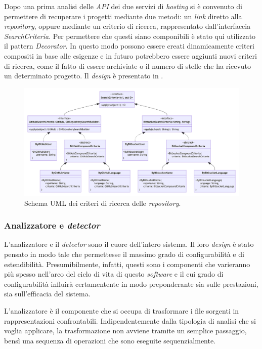 Dopo una prima analisi delle \textit{API} dei due servizi di \textit{hosting} si è convenuto di permettere di recuperare i progetti mediante due metodi: un \textit{link} diretto alla \textit{repository}, oppure mediante un criterio di ricerca, rappresentato dall'interfaccia \textit{SearchCriteria}.
%
Per permettere che questi siano componibili è stato qui utilizzato il pattern \textit{Decorator}.
%
In questo modo possono essere creati dinamicamente criteri compositi in base alle esigenze e in futuro potrebbero essere aggiunti nuovi criteri di ricerca, come il fatto di essere archiviate o il numero di stelle che ha ricevuto un determinato progetto.
%
Il \textit{design} è presentato in .

\begin{figure}[h!]
    \centering
    \includegraphics[width=\textwidth]{resources/img/02-search-criteria.pdf}
    \caption{Schema UML dei criteri di ricerca delle \textit{repository}.}
    \label{img:02-search-criteria}
\end{figure}


\subsubsection*{Analizzatore e \textit{detector}}
L'analizzatore e il \textit{detector} sono il cuore dell'intero sistema.
%
Il loro \textit{design} è stato pensato in modo tale che permettesse il massimo grado di configurabilità e di estendibilità.
%
Presumibilmente, infatti, questi sono i componenti che varieranno più spesso nell'arco del ciclo di vita di questo \textit{software} e il cui grado di configurabilità influirà certamentente in modo preponderante sia sulle prestazioni, sia sull'efficacia del sistema.

L'analizzatore è il componente che si occupa di trasformare i file sorgenti in rappresentazioni confrontabili.
%
Indipendentemente dalla tipologia di analisi che si voglia applicare, la trasformazione non avviene tramite un semplice passaggio, bensì una sequenza di operazioni che sono eseguite sequenzialmente.
%
